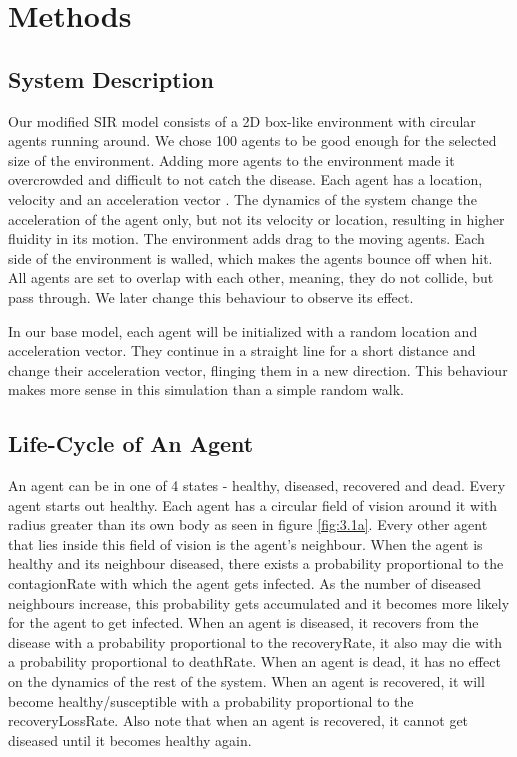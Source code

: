 \documentclass[a4paper,11pt]{article}
\begin{document}
    \section{Methods}
    \subsection{System Description}
    Our modified SIR model consists of a 2D box-like environment with circular agents running around. We chose 100 agents to be good enough for the selected size of the environment. Adding more agents to the environment made it overcrowded and difficult to not catch the disease. Each agent has a location, velocity and an acceleration vector \cite{natureOfCode}. The dynamics of the system change the acceleration of the agent only, but not its velocity or location, resulting in higher fluidity in its motion. The environment adds drag to the moving agents. Each side of the environment is walled, which makes the agents bounce off when hit. All agents are set to overlap with each other, meaning, they do not collide, but pass through. We later change this behaviour to observe its effect.

    In our base model, each agent will be initialized with a random location and acceleration vector. They continue in a straight line for a short distance and change their acceleration vector, flinging them in a new direction. This behaviour makes more sense in this simulation than a simple random walk.

    \subsection{Life-Cycle of An Agent}
    An agent can be in one of 4 states - healthy, diseased, recovered and dead. Every agent starts out healthy. Each agent has a circular field of vision around it with radius greater than its own body as seen in figure \ref{fig:3.1a}. Every other agent that lies inside this field of vision is the agent’s neighbour. When the agent is healthy and its neighbour diseased, there exists a probability proportional to the contagionRate with which the agent gets infected. As the number of diseased neighbours increase, this probability gets accumulated and it becomes more likely for the agent to get infected. When an agent is diseased, it recovers from the disease with a probability proportional to the recoveryRate, it also may die with a probability proportional to deathRate. When an agent is dead, it has no effect on the dynamics of the rest of the system. When an agent is recovered, it will become healthy/susceptible with a probability proportional to the recoveryLossRate. Also note that when an agent is recovered, it cannot get diseased until it becomes healthy again.
\end{document}
